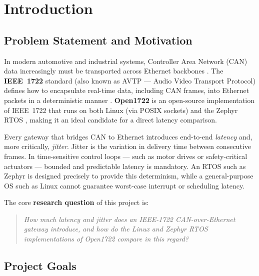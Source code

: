 \documentclass[11pt,a4paper]{article}
\begin{document}
\section{Introduction}
\label{sec:introduction}

\subsection{Problem Statement and Motivation}

In modern automotive and industrial systems, Controller Area Network (CAN) data increasingly
must be transported across Ethernet backbones \cite{iso11898}.  The \textbf{IEEE~1722}
standard (also known as AVTP --- Audio Video Transport Protocol) defines how to encapsulate
real-time data, including CAN frames, into Ethernet packets in a deterministic manner
\cite{ieee1722}.  \textbf{Open1722} is an open-source implementation of IEEE~1722 that runs
on both Linux (via POSIX sockets) and the Zephyr RTOS \cite{open1722}, making it an ideal
candidate for a direct latency comparison.

Every gateway that bridges CAN to Ethernet introduces end-to-end \emph{latency} and, more
critically, \emph{jitter}.  Jitter is the variation in delivery time between consecutive
frames.  In time-sensitive control loops --- such as motor drives or safety-critical actuators
--- bounded and predictable latency is mandatory.  An RTOS such as Zephyr \cite{zephyr} is
designed precisely to provide this determinism, while a general-purpose OS such as Linux
cannot guarantee worst-case interrupt or scheduling latency.

The core \textbf{research question} of this project is:
\begin{quote}
\emph{How much latency and jitter does an IEEE-1722 CAN-over-Ethernet gateway introduce,
and how do the Linux and Zephyr RTOS implementations of Open1722 compare in this regard?}
\end{quote}

\subsection{Project Goals}
\end{document}
